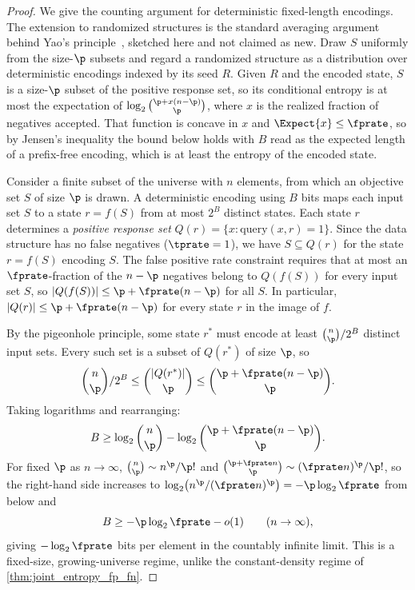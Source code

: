 \begin{proof}
We give the counting argument for deterministic fixed-length encodings.
The extension to randomized structures is the standard averaging argument
behind Yao's principle~\cite{yaoMinimax}, sketched here and not claimed as new.
Draw $S$ uniformly from the size-$\p$ subsets and regard a randomized structure
as a distribution over deterministic encodings indexed by its seed $R$.
Given $R$ and the encoded state, $S$ is a size-$\p$ subset of the positive
response set, so its conditional entropy is at most the expectation of
$\log_2\binom{\p + x(n-\p)}{\p}$, where $x$ is the realized fraction of
negatives accepted.
That function is concave in $x$ and $\Expect{x} \leq \fprate$, so by Jensen's
inequality the bound below holds with $B$ read as the expected length of a
prefix-free encoding, which is at least the entropy of the encoded state.


Consider a finite subset of the universe with $n$ elements, from which an
objective set $S$ of size $\p$ is drawn.
A deterministic encoding using $B$ bits maps each input set $S$ to a state
$r = f(S)$ from at most $2^B$ distinct states.
Each state $r$ determines a \emph{positive response set}
$Q(r) = \{x : \text{query}(x,r) = 1\}$.
Since the data structure has no false negatives ($\tprate = 1$), we have
$S \subseteq Q(r)$ for the state $r = f(S)$ encoding $S$.
The false positive rate constraint requires that at most an $\fprate$-fraction of the $n - \p$ negatives belong to $Q(f(S))$ for every input set $S$, so
$|Q(f(S))| \leq \p + \fprate(n - \p)$ for all $S$.
In particular, $|Q(r)| \leq \p + \fprate(n - \p)$ for every state $r$ in the image of $f$.

By the pigeonhole principle, some state $r^*$ must encode at least
$\binom{n}{\p} / 2^B$ distinct input sets.
Every such set is a subset of $Q(r^*)$ of size $\p$, so
\begin{equation}
\binom{n}{\p} / 2^B
    \leq \binom{|Q(r^*)|}{\p}
    \leq \binom{\p + \fprate(n - \p)}{\p}.
\end{equation}
Taking logarithms and rearranging:
\begin{equation}
B \geq \log_2 \binom{n}{\p} - \log_2 \binom{\p + \fprate(n - \p)}{\p}.
\end{equation}
For fixed $\p$ as $n \to \infty$, $\binom{n}{\p} \sim n^\p / \p!$ and
$\binom{\p + \fprate n}{\p} \sim (\fprate n)^\p / \p!$, so the right-hand side increases to
$\log_2 \bigl(n^\p / (\fprate n)^\p\bigr) = -\p \log_2 \fprate$ from below and
\begin{equation}
B \geq -\p \log_2 \fprate - o(1) \qquad (n \to \infty),
\end{equation}
giving $-\log_2 \fprate$ bits per element in the countably infinite limit.
This is a fixed-size, growing-universe regime, unlike the constant-density
regime of \cref{thm:joint_entropy_fp_fn}.
\end{proof}
